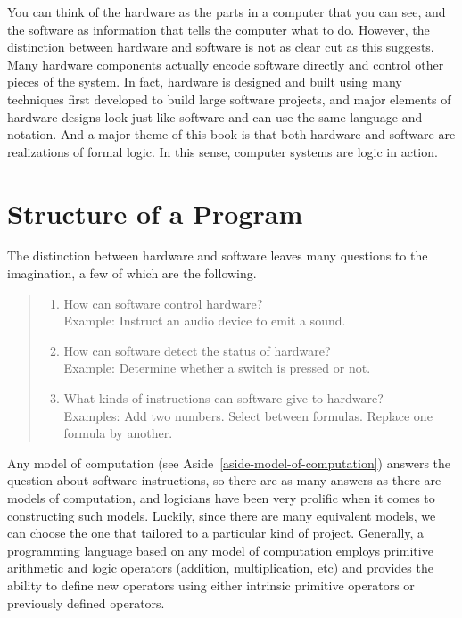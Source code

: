 You can think of the hardware as
the parts in a computer that you can see,
and the software as information that tells the computer what to do.
However, the distinction between hardware and software is not as
clear cut as this suggests. Many hardware components actually
encode software directly and control other pieces of the system.
In fact, hardware is designed and built using many techniques
first developed to build large software projects,
and major elements of hardware designs look just like software
and can use the same language and notation.
And a major theme of this book
is that both hardware and software are realizations of formal logic.
In this sense, computer systems are logic in action.

\section{Structure of a Program}

The distinction between hardware and software
leaves many questions to the imagination, a few of which are the following.
\begin{quote}
\begin{enumerate}
\item How can software control hardware?\\
      Example: Instruct an audio device to emit a sound.
\item How can software detect the status of hardware?\\
      Example: Determine whether a switch is pressed or not.
\item What kinds of instructions can software give to hardware?\\
      Examples: Add two numbers. Select between formulas. Replace one formula by another.
\end{enumerate}
\end{quote}

Any model of computation (see Aside~\ref{aside-model-of-computation})
answers the question about software instructions,
so there are as many answers as there are
models of computation, and
logicians have been very prolific when it
comes to constructing such models.
Luckily, since there are many equivalent models,
we can choose the one
that tailored to a particular kind of project.
Generally, a programming language based on any model of computation
employs primitive arithmetic and logic operators
(addition, multiplication, etc)
and provides the ability to define new operators
using either intrinsic primitive operators or previously defined operators.

